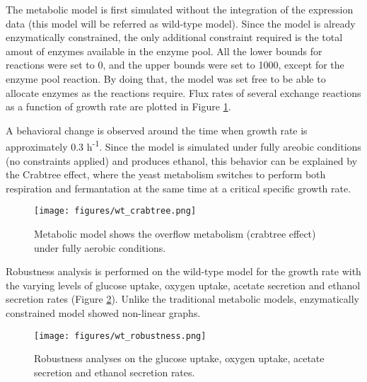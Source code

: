 The metabolic model is first simulated without the integration of the expression data (this model will be referred as wild-type model). Since the model is already enzymatically constrained, the only additional constraint required is the total amout of enzymes available in the enzyme pool. All the lower bounds for reactions were set to 0, and the upper bounds were set to 1000, except for the enzyme pool reaction. By doing that, the model was set free to be able to allocate enzymes as the reactions require. Flux rates of several exchange reactions as a function of growth rate are plotted in Figure \ref{fig:wt_crabtree}.

A behavioral change is observed around the time when growth rate is approximately 0.3 h\textsuperscript{-1}. Since the model is simulated under fully areobic conditions (no constraints applied) and produces ethanol, this behavior can be explained by the Crabtree effect, where the yeast metabolism switches to perform both respiration and fermantation at the same time at a critical specific growth rate.

\begin{figure}[H]
  \begin{center}
  \texttt{[image: figures/wt\_crabtree.png]}
  \caption[Metabolic model shows the overflow metabolism]{Metabolic model shows the overflow metabolism (crabtree effect) under fully aerobic conditions.}
  \label{fig:wt_crabtree}
  \end{center}
\end{figure}

Robustness analysis is performed on the wild-type model for the growth rate with the varying levels of glucose uptake, oxygen uptake, acetate secretion and ethanol secretion rates (Figure \ref{fig:wt_robustness}). Unlike the traditional metabolic models, enzymatically constrained model showed non-linear graphs.

\begin{figure}[H]
  \begin{center}
  \texttt{[image: figures/wt\_robustness.png]}
  \caption[Robustness analyses on the glucose uptake, oxygen uptake, acetate secretion and ethanol secretion rates]{Robustness analyses on the glucose uptake, oxygen uptake, acetate secretion and ethanol secretion rates.}
  \label{fig:wt_robustness}
  \end{center}
\end{figure}

